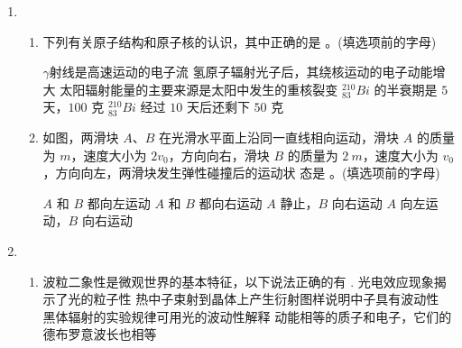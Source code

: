 \begin{enumerate}
\begin{enumerate}
\end{enumerate}


\item 
{}
\begin{enumerate}
	\item
下列有关原子结构和原子核的认识，其中正确的是
 \underlinegap 
。(填选项前的字母)

\fourchoices
{$ \gamma $射线是高速运动的电子流}
{氢原子辐射光子后，其绕核运动的电子动能增大}
{太阳辐射能量的主要来源是太阳中发生的重核裂变}
{$ ^{210}_{83}Bi $ 的半衰期是 $ 5 $ 天，$ 100 $ 克 $ ^{210}_{83}Bi $ 经过 $ 10 $ 天后还剩下 $ 50 $ 克}



\item 
如图，两滑块 $ A $、$ B $ 在光滑水平面上沿同一直线相向运动，滑块 $ A $ 的质量为 $ m $，速度大小为
$ 2 v_{0} $，方向向右，滑块 $ B $ 的质量为 $ 2 \ m $，速度大小为 $ v_{0} $，方向向左，两滑块发生弹性碰撞后的运动状
态是 \underlinegap 。(填选项前的字母)
\begin{figure}[h!]
	\centering
	
\end{figure}

\fourchoices
{$ A $ 和 $ B $ 都向左运动}
{$ A $ 和 $ B $ 都向右运动}
{$ A $ 静止，$ B $ 向右运动}
{$ A $ 向左运动，$ B $ 向右运动}

	
\end{enumerate}


\item 
{}
\begin{enumerate}
	\item
波粒二象性是微观世界的基本特征，以下说法正确的有 \underlinegap  .
\fourchoices
{光电效应现象揭示了光的粒子性}
{热中子束射到晶体上产生衍射图样说明中子具有波动性}
{黑体辐射的实验规律可用光的波动性解释}
{动能相等的质子和电子，它们的德布罗意波长也相等}



\end{enumerate}
\end{enumerate}
